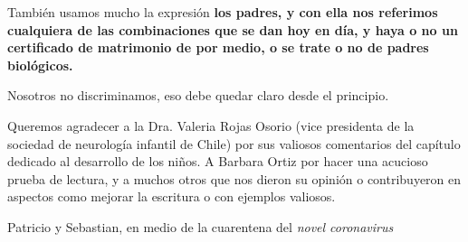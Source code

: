 Tambi\'en usamos mucho la expresi\'on \bf{los padres}, y con ella nos
referimos cualquiera de las combinaciones que se dan hoy en d\'ia, y
haya o no un certificado de matrimonio de por medio, o se trate o no de
padres biol\'ogicos.

Nosotros no discriminamos, eso debe quedar claro desde el principio.


Queremos agradecer a la Dra. Valeria Rojas Osorio (vice presidenta de la
sociedad de neurolog\'ia infantil de Chile) por sus valiosos comentarios
del cap\'itulo dedicado al desarrollo de los ni\~nos. A Barbara Ortiz por
hacer una acucioso prueba de lectura, y a muchos otros que nos dieron su
opini\'on o contribuyeron en aspectos como mejorar la escritura o con
ejemplos valiosos.

Patricio y Sebastian, en medio de la cuarentena del \it{novel coronavirus}
\fi
